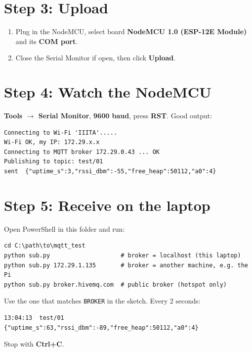 \documentclass[11pt]{article}
\newcommand{\menu}[1]{\textbf{#1}}
\begin{document}
\section*{Step 3: Upload}
\begin{enumerate}
\item Plug in the NodeMCU, select board \textbf{NodeMCU 1.0 (ESP-12E Module)} and its \textbf{COM port}.
\item Close the Serial Monitor if open, then click \menu{Upload}.
\end{enumerate}

\section*{Step 4: Watch the NodeMCU}
\menu{Tools $\rightarrow$ Serial Monitor}, \textbf{9600 baud}, press \textbf{RST}. Good output:
\begin{verbatim}
Connecting to Wi-Fi 'IIITA'.....
Wi-Fi OK, my IP: 172.29.x.x
Connecting to MQTT broker 172.29.0.43 ... OK
Publishing to topic: test/01
sent  {"uptime_s":3,"rssi_dbm":-55,"free_heap":50112,"a0":4}
\end{verbatim}

\section*{Step 5: Receive on the laptop}
Open PowerShell in this folder and run:
\begin{verbatim}
cd C:\path\to\mqtt_test
python sub.py                    # broker = localhost (this laptop)
python sub.py 172.29.1.135       # broker = another machine, e.g. the Pi
python sub.py broker.hivemq.com  # public broker (hotspot only)
\end{verbatim}
Use the one that matches \texttt{BROKER} in the sketch. Every 2 seconds:
\begin{verbatim}
13:04:13  test/01  {"uptime_s":63,"rssi_dbm":-89,"free_heap":50112,"a0":4}
\end{verbatim}
Stop with \textbf{Ctrl+C}.

\newpage
\end{document}
